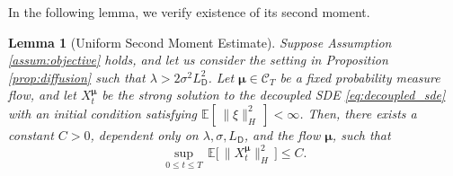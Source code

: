 \documentclass[12pt]{amsart}
\numberwithin{equation}{section}
\newtheorem{lemma}[theorem]{Lemma}
\begin{document}
In the following lemma, we verify existence of its second moment. 


\begin{lemma}[Uniform Second Moment Estimate]
\label{lem:moment_estimate}
Suppose Assumption \ref{assum:objective} holds, and let us consider the setting in Proposition \ref{prop:diffusion} such  that $\lambda > 2\sigma^2 L_{\mathsf{D}}^2$. Let $\bm{\mu} \in \mathscr{C}_T$ be a fixed probability measure flow, and let $X^{\bm{\mu}}_t$ be the strong solution to the decoupled SDE \eqref{eq:decoupled_sde} with an initial condition satisfying $\mathbb{E}[\,\|\xi\|_H^2\,] < \infty$. Then, there exists a constant $C > 0$, dependent only on $\lambda, \sigma, L_{\mathsf{D}}$, and the flow $\bm{\mu}$, such that
\begin{equation*}
    \sup_{0\leq t \leq T} \,\mathbb{E}\big[\,\|X^{\bm{\mu}}_t\|_H^2\,\big] \leq C.
\end{equation*}
\end{lemma}
\end{document}

